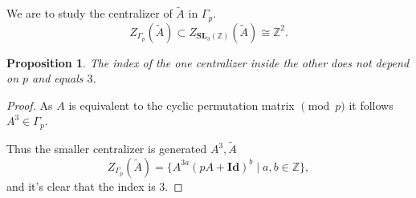 \documentclass[a4paper]{article}
\newtheorem{Prop}[Thm]{Proposition}
\newcommand{\Id}{\mathbf{Id}}        %
\newcommand{\SL}{\mathbf{SL}_3(\mathbb{Z})}        %
\newcommand{\SLp}{\Gamma_p}        %
\begin{document}
We are to study the centralizer of $\tilde A$ in $\SLp$.
\[
Z_{\SLp}(\tilde A) \subset 
Z_{\SL}(\tilde A) \cong \mathbb{Z}^2
.\] 

\begin{Prop}
	The index of the one centralizer inside the other \emph{does not depend on $p$} and equals $3$.
\end{Prop}
\begin{proof}
As $A$ is equivalent to the cyclic permutation matrix $\pmod p$ it follows $A^3 \in \SLp$.

Thus the smaller centralizer is generated $A^3, \tilde A$
\[
Z_{\SLp}(\tilde A)
= \{ A^{3a} (p A + \Id)^b \mid a, b \in \mathbb{Z} \}
,\] 
and it's clear that the index is $3$.
\end{proof}






\end{document}
